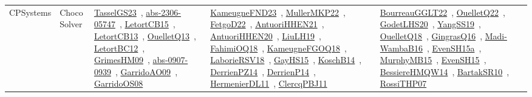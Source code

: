 {\begin{longtable}{lp{3cm}>{\raggedright\arraybackslash}p{6cm}>{\raggedright\arraybackslash}p{6cm}>{\raggedright\arraybackslash}p{8cm}}
CPSystems & Choco Solver & \href{works/TasselGS23.pdf}{TasselGS23}~\cite{TasselGS23}, \href{works/abs-2306-05747.pdf}{abs-2306-05747}~\cite{abs-2306-05747}, \href{works/LetortCB15.pdf}{LetortCB15}~\cite{LetortCB15}, \href{works/LetortCB13.pdf}{LetortCB13}~\cite{LetortCB13}, \href{works/OuelletQ13.pdf}{OuelletQ13}~\cite{OuelletQ13}, \href{works/LetortBC12.pdf}{LetortBC12}~\cite{LetortBC12}, \href{works/GrimesHM09.pdf}{GrimesHM09}~\cite{GrimesHM09}, \href{works/abs-0907-0939.pdf}{abs-0907-0939}~\cite{abs-0907-0939}, \href{works/GarridoAO09.pdf}{GarridoAO09}~\cite{GarridoAO09}, \href{works/GarridoOS08.pdf}{GarridoOS08}~\cite{GarridoOS08} & \href{works/KameugneFND23.pdf}{KameugneFND23}~\cite{KameugneFND23}, \href{works/MullerMKP22.pdf}{MullerMKP22}~\cite{MullerMKP22}, \href{works/FetgoD22.pdf}{FetgoD22}~\cite{FetgoD22}, \href{works/AntuoriHHEN21.pdf}{AntuoriHHEN21}~\cite{AntuoriHHEN21}, \href{works/AntuoriHHEN20.pdf}{AntuoriHHEN20}~\cite{AntuoriHHEN20}, \href{works/LiuLH19.pdf}{LiuLH19}~\cite{LiuLH19}, \href{works/FahimiOQ18.pdf}{FahimiOQ18}~\cite{FahimiOQ18}, \href{works/KameugneFGOQ18.pdf}{KameugneFGOQ18}~\cite{KameugneFGOQ18}, \href{works/LaborieRSV18.pdf}{LaborieRSV18}~\cite{LaborieRSV18}, \href{works/GayHS15.pdf}{GayHS15}~\cite{GayHS15}, \href{works/KoschB14.pdf}{KoschB14}~\cite{KoschB14}, \href{works/DerrienPZ14.pdf}{DerrienPZ14}~\cite{DerrienPZ14}, \href{works/DerrienP14.pdf}{DerrienP14}~\cite{DerrienP14}, \href{works/HermenierDL11.pdf}{HermenierDL11}~\cite{HermenierDL11}, \href{works/ClercqPBJ11.pdf}{ClercqPBJ11}~\cite{ClercqPBJ11} & \href{works/BourreauGGLT22.pdf}{BourreauGGLT22}~\cite{BourreauGGLT22}, \href{works/OuelletQ22.pdf}{OuelletQ22}~\cite{OuelletQ22}, \href{works/GodetLHS20.pdf}{GodetLHS20}~\cite{GodetLHS20}, \href{works/YangSS19.pdf}{YangSS19}~\cite{YangSS19}, \href{works/OuelletQ18.pdf}{OuelletQ18}~\cite{OuelletQ18}, \href{works/GingrasQ16.pdf}{GingrasQ16}~\cite{GingrasQ16}, \href{works/Madi-WambaB16.pdf}{Madi-WambaB16}~\cite{Madi-WambaB16}, \href{works/EvenSH15a.pdf}{EvenSH15a}~\cite{EvenSH15a}, \href{works/MurphyMB15.pdf}{MurphyMB15}~\cite{MurphyMB15}, \href{works/EvenSH15.pdf}{EvenSH15}~\cite{EvenSH15}, \href{works/BessiereHMQW14.pdf}{BessiereHMQW14}~\cite{BessiereHMQW14}, \href{works/BartakSR10.pdf}{BartakSR10}~\cite{BartakSR10}, \href{works/RossiTHP07.pdf}{RossiTHP07}~\cite{RossiTHP07}\\

\end{longtable}}
